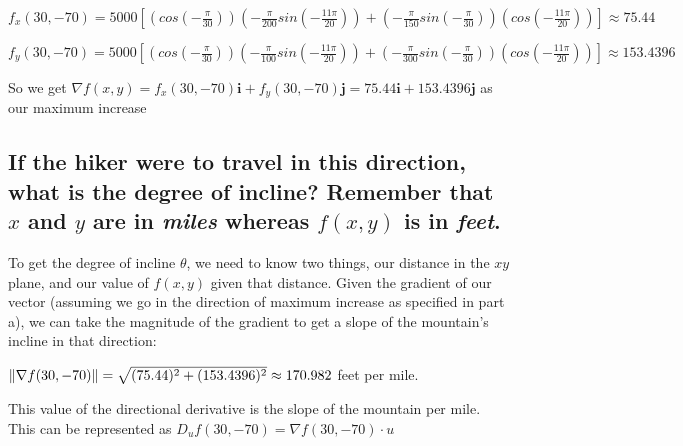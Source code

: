 \documentclass{article}
\begin{document}
\par\noindent\Large $f_{x}(30, -70) = 5000[(cos(-\frac{\pi}{30}))(-\frac{\pi}{200}sin(-\frac{11\pi}{20})) + (-\frac{\pi}{150}sin(-\frac{\pi}{30}))(cos(-\frac{11\pi}{20}))] \approx 75.44$
\par\noindent\Large $f_{y}(30, -70) = 5000[(cos(-\frac{\pi}{30}))(-\frac{\pi}{100}sin(-\frac{11\pi}{20})) + (-\frac{\pi}{300}sin(-\frac{\pi}{30}))(cos(-\frac{11\pi}{20}))] \approx 153.4396$\vspace{0.25cm}

\par\noindent\Large So we get $\nabla f(x, y) = f_{x}(30, -70)\textbf{i} + f_{y}(30, -70)\textbf{j} = 75.44\textbf{i} + 153.4396\textbf{j}$ as our maximum increase

\subsection{If the hiker were to travel in this direction, what is the degree of incline?  Remember that $x$ and $y$ are in \textit{miles} whereas $f(x, y)$ is in \textit{feet}.}
\par\noindent\Large To get the degree of incline $\theta$, we need to know two things, our distance in the $xy$ plane, and our value of $f(x, y)$ given that distance.  Given the gradient of our vector (assuming we go in the direction of maximum increase as specified in part a), we can take the magnitude of the gradient to get a slope of the mountain's incline in that direction: 
\par\noindent\Large $\norm{\nabla f(30, -70)} = \sqrt{(75.44)^{2} + (153.4396)^{2}} \approx 170.982$ feet per mile.\vspace{0.25cm}

\par\noindent\Large This value of the directional derivative is the slope of the mountain per mile.  This can be represented as $D_{u}f(30, -70) = \nabla f(30, -70) \cdot u$\vspace{0.25cm}%
\end{document}
